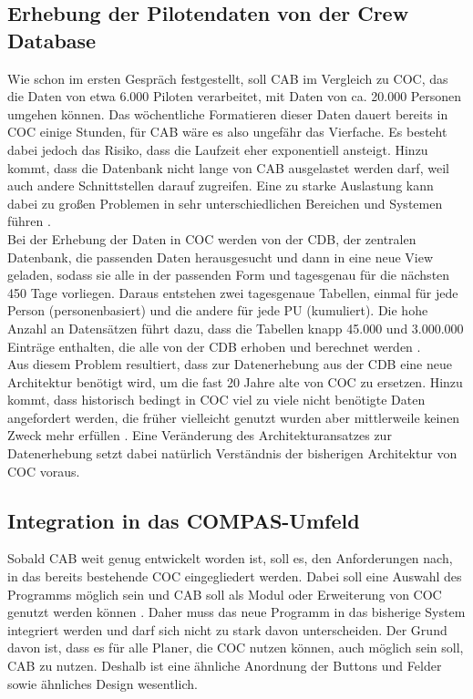 \documentclass [12pt, a4paper, oneside, titlepage, ngerman]{article}
\begin{document}
\subsection{Erhebung der Pilotendaten von der Crew Database}
Wie schon im ersten Gespräch festgestellt, soll \ac{CAB} im Vergleich zu \ac{COC}, das die Daten von etwa 6.000 Piloten verarbeitet, mit Daten von ca. 20.000 Personen umgehen können. Das wöchentliche Formatieren dieser Daten dauert bereits in \ac{COC} einige Stunden, für \ac{CAB} wäre es also ungefähr das Vierfache. Es besteht dabei jedoch das Risiko, dass die Laufzeit eher exponentiell ansteigt. Hinzu kommt, dass die Datenbank nicht lange von \ac{CAB} ausgelastet werden darf, weil auch andere Schnittstellen darauf zugreifen. Eine zu starke Auslastung kann dabei zu großen Problemen in sehr unterschiedlichen Bereichen und Systemen führen \cite[vgl.][]{Gespraech1}. \\
Bei der Erhebung der Daten in \ac{COC} werden von der \ac{CDB}, der zentralen Datenbank, die passenden Daten herausgesucht und dann in eine neue View geladen, sodass sie alle in der passenden Form und tagesgenau für die nächsten 450 Tage vorliegen. Daraus entstehen zwei tagesgenaue Tabellen, einmal für jede Person (personenbasiert) und die andere für jede PU (kumuliert). Die hohe Anzahl an Datensätzen führt dazu, dass die Tabellen knapp 45.000 und 3.000.000 Einträge enthalten, die alle von der \ac{CDB} erhoben und berechnet werden \cite[vgl.][]{Gespraech3}.  \\

\noindent Aus diesem Problem resultiert, dass zur Datenerhebung aus der \ac{CDB} eine neue Architektur benötigt wird, um die fast 20 Jahre alte von \ac{COC} zu ersetzen. Hinzu kommt, dass historisch bedingt in \ac{COC} viel zu viele nicht benötigte Daten angefordert werden, die früher vielleicht genutzt wurden aber mittlerweile keinen Zweck mehr erfüllen \cite[vgl.][]{Gespraech3}. Eine Veränderung des Architekturansatzes zur Datenerhebung setzt dabei natürlich Verständnis der bisherigen Architektur von \ac{COC} voraus.

\subsection{Integration in das COMPAS-Umfeld}
Sobald \ac{CAB} weit genug entwickelt worden ist, soll es, den Anforderungen nach, in das bereits bestehende \ac{COC} eingegliedert werden. Dabei soll eine Auswahl des Programms möglich sein und \ac{CAB} soll als Modul oder Erweiterung von \ac{COC} genutzt werden können \cite[vgl.][S.6]{anwenderkonzept}. Daher muss das neue Programm in das bisherige System integriert werden und darf sich nicht zu stark davon unterscheiden. Der Grund davon ist, dass es für alle Planer, die \ac{COC} nutzen können, auch möglich sein soll, \ac{CAB} zu nutzen. Deshalb ist eine ähnliche Anordnung der Buttons und Felder sowie ähnliches Design wesentlich. \\
\end{document}
